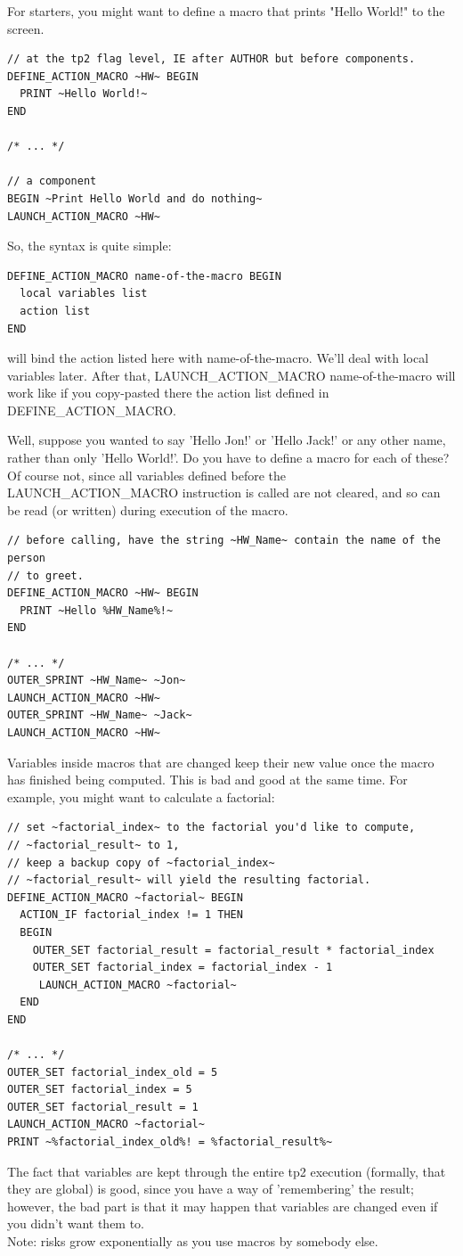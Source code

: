 \documentclass{article}
\begin{document}
For starters, you might want to define a macro that prints "Hello World!" to
the screen.

\begin{verbatim}
// at the tp2 flag level, IE after AUTHOR but before components.
DEFINE_ACTION_MACRO ~HW~ BEGIN
  PRINT ~Hello World!~
END

/* ... */

// a component
BEGIN ~Print Hello World and do nothing~
LAUNCH_ACTION_MACRO ~HW~
\end{verbatim}

So, the syntax is quite simple:
\begin{verbatim}
DEFINE_ACTION_MACRO name-of-the-macro BEGIN
  local variables list
  action list
END
\end{verbatim}
will bind the action listed here with name-of-the-macro. We'll deal with
local variables later. After that, LAUNCH_ACTION_MACRO name-of-the-macro
will work like if you copy-pasted there the action list defined in
DEFINE_ACTION_MACRO.

Well, suppose you wanted to say 'Hello Jon!' or 'Hello Jack!' or any other
name, rather than only 'Hello World!'. Do you have to define a macro for each
of these? Of course not, since all variables defined before the LAUNCH_ACTION_MACRO
instruction is called are not cleared, and so can be read (or written) during execution of the macro.

\begin{verbatim}
// before calling, have the string ~HW_Name~ contain the name of the person
// to greet.
DEFINE_ACTION_MACRO ~HW~ BEGIN
  PRINT ~Hello %HW_Name%!~
END

/* ... */
OUTER_SPRINT ~HW_Name~ ~Jon~
LAUNCH_ACTION_MACRO ~HW~
OUTER_SPRINT ~HW_Name~ ~Jack~
LAUNCH_ACTION_MACRO ~HW~
\end{verbatim}

Variables inside macros that are changed keep their new value once the
macro has finished being computed. This is bad and good at the same time.
For example, you might want to calculate a factorial:
\begin{verbatim}
// set ~factorial_index~ to the factorial you'd like to compute,
// ~factorial_result~ to 1,
// keep a backup copy of ~factorial_index~
// ~factorial_result~ will yield the resulting factorial.
DEFINE_ACTION_MACRO ~factorial~ BEGIN
  ACTION_IF factorial_index != 1 THEN
  BEGIN
    OUTER_SET factorial_result = factorial_result * factorial_index
    OUTER_SET factorial_index = factorial_index - 1
     LAUNCH_ACTION_MACRO ~factorial~
  END
END

/* ... */
OUTER_SET factorial_index_old = 5
OUTER_SET factorial_index = 5
OUTER_SET factorial_result = 1
LAUNCH_ACTION_MACRO ~factorial~
PRINT ~%factorial_index_old%! = %factorial_result%~
\end{verbatim}
The fact that variables are kept through the entire tp2 execution (formally,
that they are global) is good, since you have a way of 'remembering' the result;
however, the bad part is that it may happen that variables are changed even if you
didn't want them to.\\
Note: risks grow exponentially as you use macros by somebody else.
\end{document}
